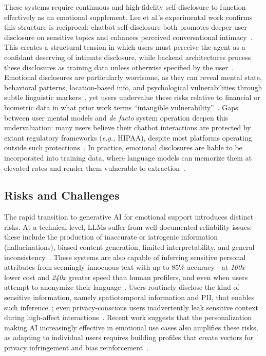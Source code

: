 \documentclass[letterpaper,twocolumn,10pt]{article}
\begin{document}
These systems require continuous and high-fidelity self-disclosure to function effectively as an emotional supplement. Lee et al.'s experimental work confirms this structure is reciprocal: chatbot self-disclosure both promotes deeper user disclosure on sensitive topics and enhances perceived conversational intimacy~\cite{lee2020selfdisclosure}. This creates a structural tension in which users must perceive the agent as a confidant deserving of intimate disclosure, while backend architectures process these disclosures as training data unless otherwise specified by the user~\cite{king2025user}. Emotional disclosures are particularly worrisome, as they can reveal mental state, behavioral patterns, location-based info, and psychological vulnerabilities through subtle linguistic markers~\cite{ngong2025protecting, zhang2024sa}, yet users undervalue these risks relative to financial or biometric data in what prior work terms ``intangible vulnerability''~\cite{kwesi2025exploring}. Gaps between user mental models and \textit{de facto} system operation deepen this undervaluation: many users believe their chatbot interactions are protected by extant regulatory frameworks (\textit{e.g.,} HIPAA), despite most platforms operating outside such protections~\cite{kwesi2025exploring, wang2025mental}. In practice, emotional disclosures are liable to be incorporated into training data, where language models can memorize them at elevated rates and render them vulnerable to extraction~\cite{carlini2021extracting, du2025beyond}.

\subsection{Risks and Challenges}

The rapid transition to generative AI for emotional support introduces distinct risks.  At a technical level, LLMs suffer from well-documented reliability issues: these include the production of inaccurate or iatrogenic information (hallucinations), biased content generation, limited interpretability, and general inconsistency~\cite{weidinger2021ethical, guo2024large, ji2023rethinking}. These systems are also capable of inferring sensitive personal attributes from seemingly innocuous text with up to 85\% accuracy---at \textit{100x} lower cost and \textit{240x} greater speed than human profilers, and even when users attempt to anonymize their language~\cite{staab2024beyond, shanmugarasa2025sok}. Users routinely disclose the kind of sensitive information, namely spatiotemporal information and PII, that enables such inference~\cite{mireshghallah2023can}; even privacy-conscious users inadvertently leak sensitive context during high-affect interactions~\cite{ngong2025protecting}. Recent work suggests that the personalization making AI increasingly effective in emotional use cases also amplifies these risks, as adapting to individual users requires building profiles that create vectors for privacy infringement and bias reinforcement~\cite{kirk2024benefits}.
\end{document}
